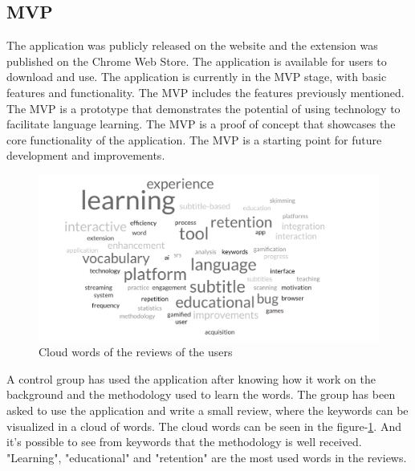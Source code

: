 \documentclass[12pt]{article}
\begin{document}
\subsection{MVP}
The application was publicly released on the website and the extension was published on the Chrome Web Store. The application is available for users to download and use. The application is currently in the MVP stage, with basic features and functionality. The MVP includes the features previously mentioned. \\
The MVP is a prototype that demonstrates the potential of using technology to facilitate language learning. The MVP is a proof of concept that showcases the core functionality of the application. The MVP is a starting point for future development and improvements. \\
\begin{figure}[!h]
  \centering
  \caption{
  Cloud words of the reviews of the users
  }
  \label{fig:cloud_words}
  \includegraphics[width=1\textwidth]{assets/33.png}
\end{figure}
A control group has used the application after knowing how it work on the background and the methodology used to learn the words. The group has been asked to use the application and write a small review, where the keywords can be visualized in a cloud of words. The cloud words can be seen in the figure-\ref{fig:cloud_words}. And it's possible to see from keywords that the methodology is well received. "Learning", "educational" and "retention" are the most used words in the reviews. \\
\end{document}
